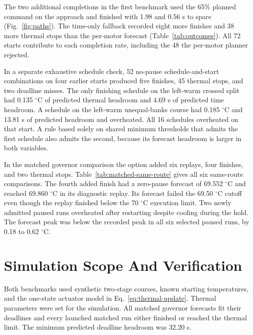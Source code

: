 \documentclass{ieeeaccess}
\begin{document}
The two additional completions in the first benchmark used the 65\% planned command on the approach and finished with 1.98 and 0.56 s to spare (Fig.~\ref{fig:paths}). The time-only fallback recorded eight more finishes and 38 more thermal stops than the per-motor forecast (Table~\ref{tab:outcomes}). All 72 starts contribute to each completion rate, including the 48 the per-motor planner rejected.

In a separate exhaustive schedule check, 52 no-pause schedule-and-start combinations on four earlier starts produced five finishes, 45 thermal stops, and two deadline misses. The only finishing schedule on the left-warm crossed split had 0.135 \ensuremath{{}^{\circ}\mathrm{C}} of predicted thermal headroom and 4.69 s of predicted time headroom. A schedule on the left-warm unequal-banks course had 0.185 \ensuremath{{}^{\circ}\mathrm{C}} and 13.81 s of predicted headroom and overheated. All 16 schedules overheated on that start. A rule based solely on shared minimum thresholds that admits the first schedule also admits the second, because its forecast headroom is larger in both variables.

In the matched governor comparison the option added six replays, four finishes, and two thermal stops. Table~\ref{tab:matched-same-route} gives all six same-route comparisons. The fourth added finish had a zero-pause forecast of 69.552 \ensuremath{{}^{\circ}\mathrm{C}} and reached 69.860 \ensuremath{{}^{\circ}\mathrm{C}} in its diagnostic replay. Its forecast failed the 69.50 \ensuremath{{}^{\circ}\mathrm{C}} cutoff even though the replay finished below the 70 \ensuremath{{}^{\circ}\mathrm{C}} execution limit. Two newly admitted paused runs overheated after restarting despite cooling during the hold. The forecast peak was below the recorded peak in all six selected paused runs, by 0.18 to 0.62 \ensuremath{{}^{\circ}\mathrm{C}}.

\section{Simulation Scope And Verification}

Both benchmarks used synthetic two-stage courses, known starting temperatures, and the one-state actuator model in Eq.~\eqref{eq:thermal-update}. Thermal parameters were set for the simulation. All matched governor forecasts fit their deadlines and every launched matched run either finished or reached the thermal limit. The minimum predicted deadline headroom was 32.20 s.
\end{document}
